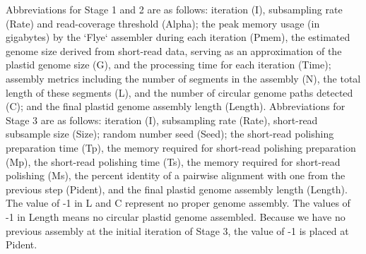 \begingroup
\scriptsize
\setlength{\parskip}{2pt}

Abbreviations for Stage 1 and 2 are as follows: 
iteration (I), subsampling rate (Rate) and read-coverage threshold (Alpha);
the peak memory usage (in gigabytes) by the `Flye` assembler during each iteration (Pmem),
the estimated genome size derived from short-read data, serving as an approximation of the plastid genome size (G), and
the processing time for each iteration (Time);
assembly metrics including the number of segments in the assembly (N),
the total length of these segments (L), and
the number of circular genome paths detected (C); and
the final plastid genome assembly length (Length).
Abbreviations for Stage 3 are as follows: 
iteration (I), subsampling rate (Rate), short-read subsample size (Size);
random number seed (Seed);
the short-read polishing preparation time (Tp),
the memory required for short-read polishing preparation (Mp),
the short-read polishing time (Ts),
the memory required for short-read polishing (Ms),
the percent identity of a pairwise alignment with one from the previous step (Pident), and
the final plastid genome assembly length (Length).
The value of -1 in L and C represent no proper genome assembly.
The values of -1 in Length means no circular plastid genome assembled.
Because we have no previous assembly at the initial iteration of Stage 3,
the value of -1 is placed at Pident.

\endgroup

